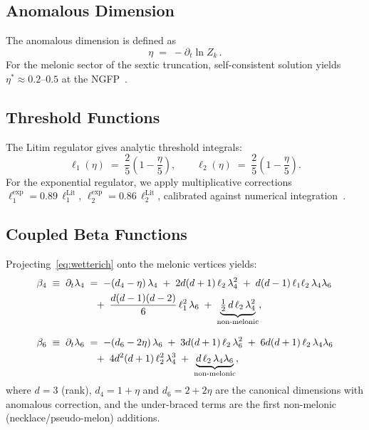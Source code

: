 \documentclass[11pt,a4paper]{article}
\theoremstyle{definition}
\theoremstyle{plain}
\theoremstyle{remark}
\begin{document}
\subsection{Anomalous Dimension}

The anomalous dimension is defined as
\begin{equation}
  \eta \;=\; -\partial_t \ln Z_k\,.
  \label{eq:eta}
\end{equation}
For the melonic sector of the sextic truncation, self-consistent
solution yields $\eta^* \approx 0.2$--$0.5$ at the NGFP~\cite{benedetti2015,carrozza2017}.

\subsection{Threshold Functions}

The Litim regulator gives analytic threshold integrals:
\begin{equation}
  \ell_1(\eta) \;=\; \frac{2}{5}\left(1-\frac{\eta}{5}\right), \qquad
  \ell_2(\eta) \;=\; \frac{2}{5}\left(1-\frac{\eta}{5}\right).
  \label{eq:thresholds_litim}
\end{equation}
For the exponential regulator, we apply multiplicative corrections
$\ell_1^{\exp}=0.89\,\ell_1^{\text{Lit}}$,\;
$\ell_2^{\exp}=0.86\,\ell_2^{\text{Lit}}$,
calibrated against numerical integration~\cite{litim2001}.

\subsection{Coupled Beta Functions}

Projecting~\eqref{eq:wetterich} onto the melonic vertices yields:
\begin{align}
  \beta_4 \;\equiv\; \partial_t\lambda_4
  &\;=\;
  -(d_4 - \eta)\,\lambda_4
  \;+\;
  2d(d+1)\,\ell_2\,\lambda_4^2
  \;+\;
  d(d-1)\,\ell_1\ell_2\,\lambda_4\lambda_6 \notag\\
  &\quad+\;
  \frac{d(d-1)(d-2)}{6}\,\ell_1^2\,\lambda_6
  \;+\;
  \underbrace{\tfrac{1}{2}\,d\,\ell_2\,\lambda_4^2}_{\text{non-melonic}},
  \label{eq:beta4}
  \\[8pt]
  \beta_6 \;\equiv\; \partial_t\lambda_6
  &\;=\;
  -(d_6 - 2\eta)\,\lambda_6
  \;+\;
  3d(d+1)\,\ell_2\,\lambda_6^2
  \;+\;
  6d(d+1)\,\ell_2\,\lambda_4\lambda_6 \notag\\
  &\quad+\;
  4d^2(d+1)\,\ell_2^2\,\lambda_4^3
  \;+\;
  \underbrace{d\,\ell_2\,\lambda_4\lambda_6}_{\text{non-melonic}},
  \label{eq:beta6}
\end{align}
where $d=3$ (rank), $d_4=1+\eta$ and $d_6=2+2\eta$ are the canonical
dimensions with anomalous correction, and the under-braced terms are the
first non-melonic (necklace/pseudo-melon) additions.
\end{document}
